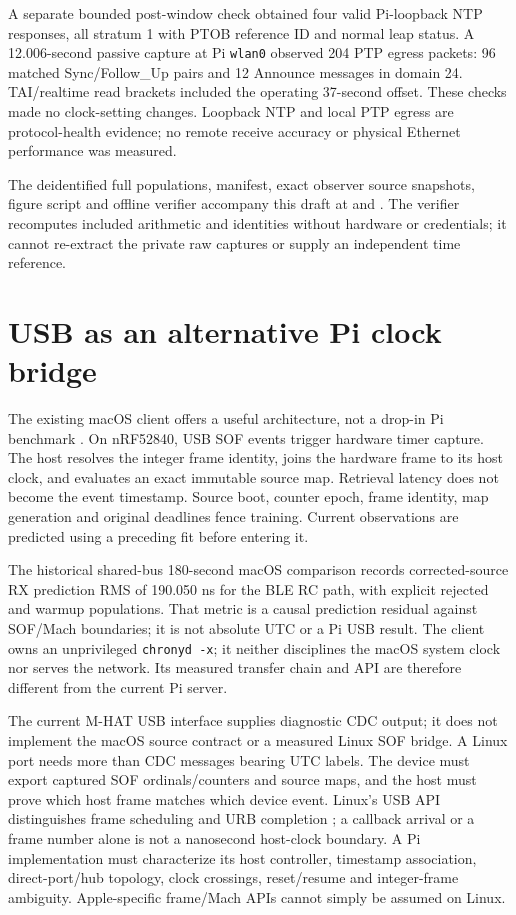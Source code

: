 \documentclass[10pt,letterpaper]{article}
\newcommand{\code}[1]{\texttt{\small #1}}
\begin{document}
A separate bounded post-window check obtained four valid Pi-loopback NTP
responses, all stratum 1 with PTOB reference ID and normal leap status. A
12.006-second passive capture at Pi \code{wlan0} observed 204 PTP egress
packets: 96 matched Sync/Follow\_Up pairs and 12 Announce messages in domain 24.
TAI/realtime read brackets included the operating 37-second offset. These
checks made no clock-setting changes. Loopback NTP and local PTP egress are
protocol-health evidence; no remote receive accuracy or physical Ethernet
performance was measured.

The deidentified full populations, manifest, exact observer source snapshots,
figure script and offline verifier accompany this draft at
 and .
The verifier recomputes included arithmetic and identities without hardware or
credentials; it cannot re-extract the private raw captures or supply an
independent time reference.

\section{USB as an alternative Pi clock bridge}
The existing macOS client offers a useful architecture, not a drop-in Pi
benchmark \cite{macpaper,macevidence}. On nRF52840, USB SOF events trigger
hardware timer capture. The host resolves the integer frame identity, joins the
hardware frame to its host clock, and evaluates an exact immutable source map.
Retrieval latency does not become the event timestamp. Source boot, counter
epoch, frame identity, map generation and original deadlines fence training.
Current observations are predicted using a preceding fit before entering it.

The historical shared-bus 180-second macOS comparison records corrected-source
RX prediction RMS of 190.050 ns for the BLE RC path, with explicit rejected and
warmup populations. That metric is a causal prediction residual against
SOF/Mach boundaries; it is not absolute UTC or a Pi USB result. The client owns
an unprivileged \code{chronyd -x}; it neither disciplines the macOS system clock
nor serves the network. Its measured transfer chain and API are therefore
different from the current Pi server.

The current M-HAT USB interface supplies diagnostic CDC output; it does not
implement the macOS source contract or a measured Linux SOF bridge.
A Linux port needs more than CDC messages bearing UTC labels. The device must
export captured SOF ordinals/counters and source maps, and the host must prove
which host frame matches which device event. Linux's USB API distinguishes
frame scheduling and URB completion \cite{linuxusb}; a callback arrival or a
frame number alone is not a nanosecond host-clock boundary. A Pi implementation
must characterize its host controller, timestamp association, direct-port/hub
topology, clock crossings, reset/resume and integer-frame ambiguity.
Apple-specific frame/Mach APIs cannot simply be assumed on Linux.
\end{document}
